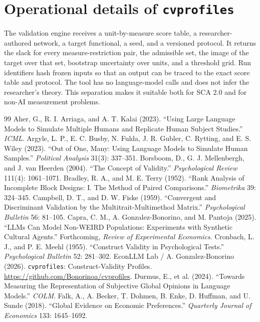 \documentclass[10pt,letterpaper]{article}
\newcommand{\cvp}{\texttt{cvprofiles}}
\begin{document}
\section{Operational details of \cvp{}}
The validation engine receives a unit-by-measure score table, a researcher-authored network, a target functional, a seed, and a versioned protocol. It returns the slack for every measure-restriction pair, the admissible set, the image of the target over that set, bootstrap uncertainty over units, and a threshold grid. Run identifiers hash frozen inputs so that an output can be traced to the exact score table and protocol. The tool has no language-model calls and does not infer the researcher's theory. This separation makes it suitable both for SCA 2.0 and for non-AI measurement problems.

\begin{thebibliography}{99}\small
{} Aher, G., R. I. Arriaga, and A. T. Kalai (2023). ``Using Large Language Models to Simulate Multiple Humans and Replicate Human Subject Studies.'' \textit{ICML}.
 Argyle, L. P., E. C. Busby, N. Fulda, J. R. Gubler, C. Rytting, and E. S. Wiley (2023). ``Out of One, Many: Using Language Models to Simulate Human Samples.'' \textit{Political Analysis} 31(3): 337--351.
 Borsboom, D., G. J. Mellenbergh, and J. van Heerden (2004). ``The Concept of Validity.'' \textit{Psychological Review} 111(4): 1061--1071.
 Bradley, R. A., and M. E. Terry (1952). ``Rank Analysis of Incomplete Block Designs: I. The Method of Paired Comparisons.'' \textit{Biometrika} 39: 324--345.
 Campbell, D. T., and D. W. Fiske (1959). ``Convergent and Discriminant Validation by the Multitrait-Multimethod Matrix.'' \textit{Psychological Bulletin} 56: 81--105.
 Capra, C. M., A. Gonzalez-Bonorino, and M. Pantoja (2025). ``LLMs Can Model Non-WEIRD Populations: Experiments with Synthetic Cultural Agents.'' Forthcoming, \textit{Review of Experimental Economics}.
 Cronbach, L. J., and P. E. Meehl (1955). ``Construct Validity in Psychological Tests.'' \textit{Psychological Bulletin} 52: 281--302.
 EconLLM Lab / A. Gonzalez-Bonorino (2026). \texttt{cvprofiles}: Construct-Validity Profiles. \url{https://github.com/Bonorinoa/cvprofiles}.
 Durmus, E., et al. (2024). ``Towards Measuring the Representation of Subjective Global Opinions in Language Models.'' \textit{COLM}.
 Falk, A., A. Becker, T. Dohmen, B. Enke, D. Huffman, and U. Sunde (2018). ``Global Evidence on Economic Preferences.'' \textit{Quarterly Journal of Economics} 133: 1645--1692.

\end{thebibliography}
\end{document}

